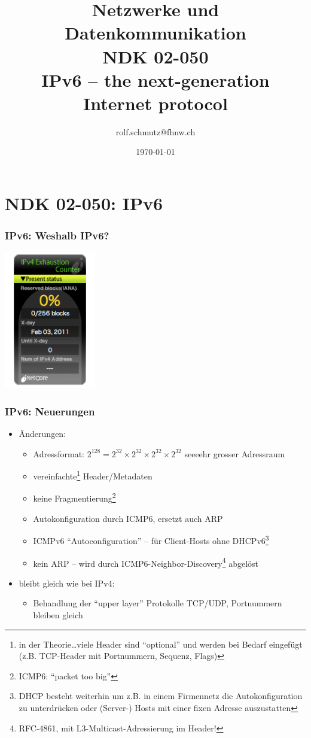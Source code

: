 \documentclass[ignorenonframetext]{beamer}
\date{\today}
\author{rolf.schmutz@fhnw.ch}
\institute{FHNW}
\title {Netzwerke und Datenkommunikation\\NDK 02-050\\IPv6 -- the next-generation Internet protocol}
\begin{document}

\section{NDK 02-050: IPv6}



\begin{frame}
\titlepage
\end{frame}

\begin{frame}
\frametitle{IPv6: Weshalb IPv6?}
\begin{center}
  \includegraphics[height=6cm]{ipv4ec_iana_en.png}
\end{center}
\end{frame}

\begin{frame}
\frametitle{IPv6: Neuerungen}
\begin{itemize}
  \item \"Anderungen:
    \begin{itemize}
      \item Adressformat: $2^{128}=2^{32}\times 2^{32}\times 2^{32}\times 2^{32}$ seeeehr grosser Adressraum
      \item vereinfachte\footnote{in der Theorie\ldots viele Header sind ``optional'' und werden bei Bedarf eingef\"ugt (z.B. TCP-Header mit Portnummern, Sequenz, Flags)} Header/Metadaten
      \item keine Fragmentierung\footnote{ICMP6: ``packet too big''}
      \item Autokonfiguration durch ICMP6, ersetzt auch ARP
      \item ICMPv6 ``Autoconfiguration'' -- f\"ur Client-Hosts ohne DHCPv6\footnote{DHCP besteht weiterhin um z.B. in einem Firmennetz die Autokonfiguration zu unterdr\"ucken oder (Server-) Hosts mit einer fixen Adresse auszustatten}
      \item kein ARP -- wird durch ICMP6-Neighbor-Discovery\footnote{RFC-4861, mit L3-Multicast-Adressierung im Header!} abgel\"ost
    \end{itemize}
  \item bleibt gleich wie bei IPv4:
    \begin{itemize}
      \item Behandlung der ``upper layer'' Protokolle TCP/UDP, Portnummern bleiben gleich
    \end{itemize}
\end{itemize}
\end{frame}
\end{document}
